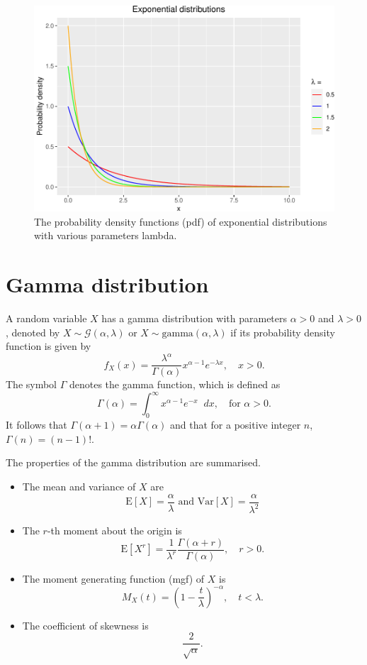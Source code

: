 \documentclass[landscape, 20pt]{extreport}
\theoremstyle{definition}
\theoremstyle{definition}
\theoremstyle{definition}
\theoremstyle{definition}
\theoremstyle{remark}
\begin{document}
\begin{figure}
\centering
\includegraphics{FigExp-1.pdf}
\caption{\label{fig:FigExp}The probability density functions (pdf) of exponential distributions with various parameters lambda.}
\end{figure}

\hypertarget{gamma-distribution}{%
\section{Gamma distribution}\label{gamma-distribution}}

A random variable \(X\) has a gamma distribution with parameters
\(\alpha > 0\) and \(\lambda > 0\), denoted by
\(X \sim \mathcal{G}(\alpha, \lambda)\) or
\(X \sim \text{gamma}(\alpha, \lambda)\) if its probability density
function is given by
\[f_X(x) = \frac{\lambda^\alpha}{\Gamma(\alpha)} x^{\alpha -1} e^{-\lambda x}, \quad x > 0.\]
The symbol \(\Gamma\) denotes the gamma function, which is defined as
\[\Gamma(\alpha) = \int_{0}^\infty x^{\alpha - 1} e^{-x} \mathop{}\!dx, \quad \text{for } \alpha > 0.\]
It follows that \(\Gamma(\alpha + 1) = \alpha \Gamma(\alpha)\) and that
for a positive integer \(n\), \(\Gamma(n) = (n-1)!\).

The properties of the gamma distribution are summarised.

\begin{itemize}
\item
  The mean and variance of \(X\) are
  \[\mathrm{E}[X] = \frac{\alpha}{\lambda} \text{ and } \mathrm{Var}[X] =\frac{\alpha}{\lambda^2}\]
\item
  The \(r\)-th moment about the origin is
  \[\mathrm{E}[X^r] = \frac{1}{\lambda^r} \frac{\Gamma(\alpha + r)}{\Gamma(\alpha )}, \quad r > 0.\]
\item
  The moment generating function (mgf) of \(X\) is
  \[M_X(t) = \left(1 -  \frac{t}{\lambda}\right)^{-\alpha}, \quad t < \lambda.\]
\item
  The coefficient of skewness is \[\frac{2}{\sqrt{\alpha}}.\]
\end{itemize}
\end{document}
